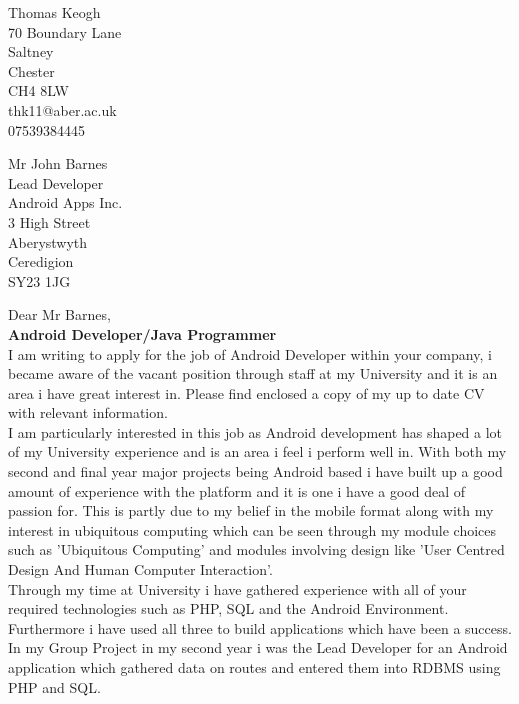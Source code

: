 \documentclass[10pt,a4paper]{article}
\begin{document}
\begin{minipage}{1\textwidth}
\begin{flushright}
Thomas Keogh\\
70 Boundary Lane\\
Saltney\\
Chester\\
CH4 8LW\\
thk11@aber.ac.uk\\
07539384445
\end{flushright}
\end{minipage}
\begin{minipage}{1\textwidth}
\begin{flushleft}
Mr John Barnes\\
Lead Developer\\
Android Apps Inc.\\
3 High Street\\
Aberystwyth\\
Ceredigion\\
SY23 1JG\\
\vspace{0.6cm}
\end{flushleft}
\end{minipage}

\noindent
Dear Mr Barnes,\\

\textbf{Android Developer/Java Programmer}\\

\noindent
I am writing to apply for the job of Android Developer within your company, i became aware of the vacant position through staff at my University and it is an area i have great interest in. Please find enclosed a copy of my up to date CV with relevant information.\\

\noindent
I am particularly interested in this job as Android development has shaped a lot of my University experience and is an area i feel i perform well in. With both my second and final year major projects being Android based i have built up a good amount of experience with the platform and it is one i have a good deal of passion for. This is partly due to my belief in the mobile format along with my interest in ubiquitous computing which can be seen through my module choices such as 'Ubiquitous Computing' and modules involving design like 'User Centred Design And Human Computer Interaction'.\\

\noindent
Through my time at University i have gathered experience with all of your required technologies such as PHP, SQL and the Android Environment. Furthermore i have used all three to build applications which have been a success. In my Group Project in my second year i was the Lead Developer for an Android application which gathered data on routes and entered them into RDBMS using PHP and SQL.\\
\end{document}
